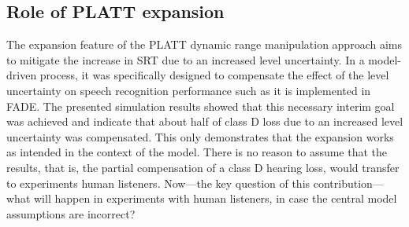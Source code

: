 \documentclass[10pt,a4paper,twocolumn]{article}
\begin{document}
\subsection*{Role of PLATT expansion}
%
The expansion feature of the PLATT dynamic range manipulation approach aims to mitigate the increase in SRT due to an increased level uncertainty.
%
In a model-driven process, it was specifically designed to compensate the effect of the level uncertainty on speech recognition performance such as it is implemented in FADE.
%
The presented simulation results showed that this necessary interim goal was achieved and indicate that about half of class D loss due to an increased level uncertainty was compensated.
%
This only demonstrates that the expansion works as intended in the context of the model.
%
There is no reason to assume that the results, that is, the partial compensation of a class D hearing loss, would transfer to experiments human listeners.
%
Now---the key question of this contribution---what will happen in experiments with human listeners, in case the central model assumptions are incorrect?
\end{document}
